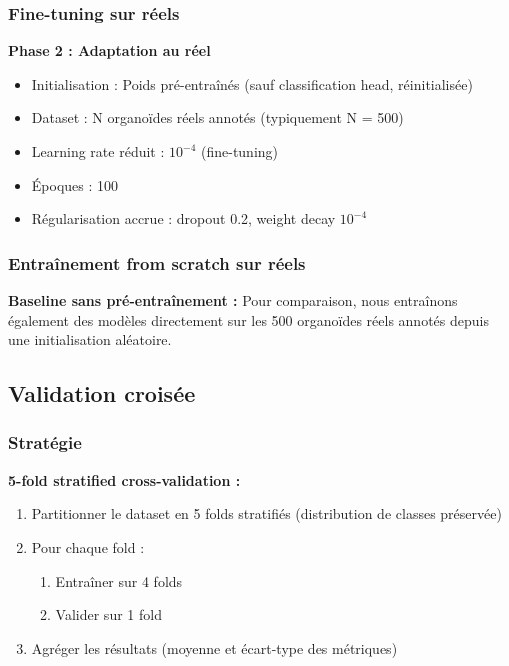 \subsubsection{Fine-tuning sur réels}

\textbf{Phase 2 : Adaptation au réel}
\begin{itemize}
    \item Initialisation : Poids pré-entraînés (sauf classification head, réinitialisée)
    \item Dataset : N organoïdes réels annotés (typiquement N = 500)
    \item Learning rate réduit : $10^{-4}$ (fine-tuning)
    \item Époques : 100
    \item Régularisation accrue : dropout 0.2, weight decay $10^{-4}$
\end{itemize}

\subsubsection{Entraînement from scratch sur réels}

\textbf{Baseline sans pré-entraînement :}
Pour comparaison, nous entraînons également des modèles directement sur les 500 organoïdes réels annotés depuis une initialisation aléatoire.

\subsection{Validation croisée}

\subsubsection{Stratégie}

\textbf{5-fold stratified cross-validation :}
\begin{enumerate}
    \item Partitionner le dataset en 5 folds stratifiés (distribution de classes préservée)
    \item Pour chaque fold :
    \begin{enumerate}
        \item Entraîner sur 4 folds
        \item Valider sur 1 fold
    \end{enumerate}
    \item Agréger les résultats (moyenne et écart-type des métriques)
\end{enumerate}

